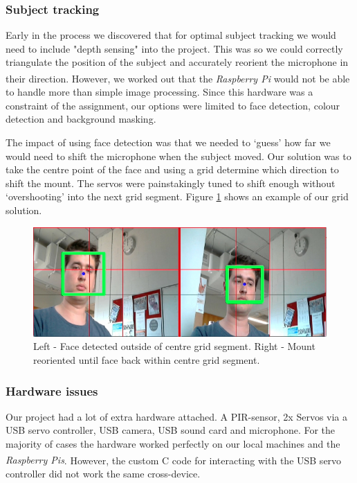 \documentclass[11pt,a4paper,titlepage]{report}
\newcommand{\rpi}{\textit{Raspberry Pi\textsuperscript{\textregistered}}}
\newcommand{\rpis}{\textit{Raspberry Pi\textsuperscript{\textregistered}s}}
\begin{document}
\subsubsection{Subject tracking}

Early in the process we discovered that for optimal subject tracking we would need to include "depth sensing" into the project. This was so we could correctly triangulate the position of the subject and accurately reorient the microphone in their direction. However, we worked out that the \rpi\xspace would not be able to handle more than simple image processing. Since this hardware was a constraint of the assignment, our options were limited to face detection, colour detection and background masking. 

The impact of using face detection was that we needed to `guess' how far we would need to shift the microphone when the subject moved. Our solution was to take the centre point of the face and using a grid determine which direction to shift the mount. The servos were painstakingly tuned to shift enough without `overshooting' into the next grid segment. Figure \ref{fig:face} shows an example of our grid solution.

\begin{figure}
\centering
\includegraphics[width=\textwidth]{graphs/face.jpg}
\caption{Left - Face detected outside of centre grid segment. Right - Mount reoriented until face back within centre grid segment.}
\label{fig:face}
\end{figure}

\subsubsection{Hardware issues}

Our project had a lot of extra hardware attached. A PIR-sensor, 2x Servos via a USB servo controller, USB camera, USB sound card and microphone. For the majority of cases the hardware worked perfectly on our local machines and the \rpis. However, the custom C code for interacting with the USB servo controller did not work the same cross-device.
\end{document}

